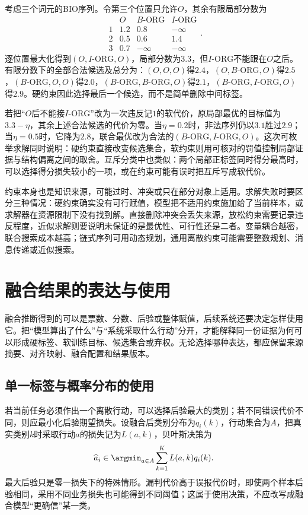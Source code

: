 考虑三个词元的BIO序列。令第三个位置只允许$O$，其余有限局部分数为
\[
  \begin{array}{c|ccc}
    & O & B\text{-ORG} & I\text{-ORG} \\
    \hline
    1 & 1.2 & 0.8 & -\infty \\
    2 & 0.5 & 0.6 & 1.4 \\
    3 & 0.7 & -\infty & -\infty
  \end{array}.
\]
逐位置最大化得到$(O,I\text{-ORG},O)$，局部分数为$3.3$，但$I\text{-ORG}$不能跟在$O$之后。有限分数下的全部合法候选及总分为：$(O,O,O)$得$2.4$，$(O,B\text{-ORG},O)$得$2.5$，$(B\text{-ORG},O,O)$得$2.0$，$(B\text{-ORG},B\text{-ORG},O)$得$2.1$，$(B\text{-ORG},I\text{-ORG},O)$得$2.9$。硬约束因此选择最后一个候选，而不是简单删除中间标签。

若把“$O$后不能接$I\text{-ORG}$”改为一次违反记$1$的软代价，原局部最优的目标值为$3.3-\eta$，其余上述合法候选的代价为零。当$\eta=0.2$时，非法序列仍以$3.1$胜过$2.9$；当$\eta=0.5$时，它降为$2.8$，联合最优改为合法的$(B\text{-ORG},I\text{-ORG},O)$。这次可枚举求解同时说明：硬约束直接改变候选集合，软约束则用可核对的罚值控制局部证据与结构偏离之间的取舍。互斥分类中也类似：两个局部正标签同时得分最高时，可以选择得分损失较小的一项，或在约束可能有误时把互斥写成软代价。

约束本身也是知识来源，可能过时、冲突或只在部分对象上适用。求解失败时要区分三种情况：硬约束确实没有可行赋值，模型把不适用约束施加给了当前样本，或求解器在资源限制下没有找到解。直接删除冲突会丢失来源，放松约束需要记录违反程度，近似求解则要说明未保证的是最优性、可行性还是二者。变量耦合越密，联合搜索成本越高；链式序列可用动态规划，通用离散约束可能需要整数规划、消息传递或近似搜索。

\section{融合结果的表达与使用}
\label{sec:knowledge-fusion-result-use}

融合推断得到的可以是票数、分数、后验或整体赋值，后续系统还要决定怎样使用它。把“模型算出了什么”与“系统采取什么行动”分开，才能解释同一份证据为何可以形成硬标签、软训练目标、候选集合或弃权。无论选择哪种表达，都应保留来源摘要、对齐映射、融合配置和结果版本。

\subsection{单一标签与概率分布的使用}
\label{sec:knowledge-fusion-label-probability-use}

若当前任务必须作出一个离散行动，可以选择后验最大的类别；若不同错误代价不同，则应最小化后验期望损失。设融合后类别分布为$q_i(k)$，行动集合为$A$，把真实类别$k$时采取行动$a$的损失记为$L(a,k)$，贝叶斯决策为
\begin{equation}
  \widehat a_i
  \in\argmin_{a\in A}
  \sum_{k=1}^{K}L(a,k)q_i(k).
  \label{eq:knowledge-fusion-bayes-decision}
\end{equation}
最大后验只是零一损失下的特殊情形。漏判代价高于误报代价时，即使两个样本后验相同，采用不同业务损失也可能得到不同阈值；这属于使用决策，不应改写成融合模型“更确信”某一类。

